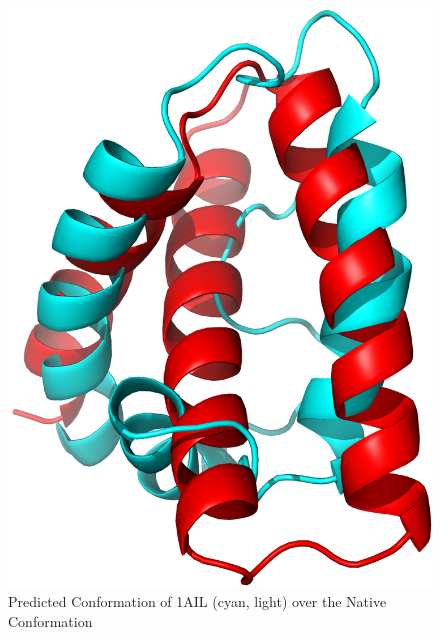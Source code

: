 \begin{figure}[ht]
    \centering
    \includegraphics[width=\linewidth]{Figuras/1ail_.png}
    \caption{Predicted Conformation of 1AIL (cyan, light) over the Native Conformation}
    \label{fig:1ail-visual}
\end{figure}